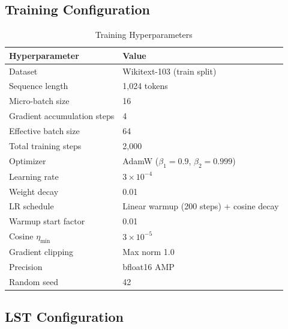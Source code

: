 \documentclass[conference]{IEEEtran}
\begin{document}
\subsection{Training Configuration}

\begin{table}[h]
\centering
\caption{Training Hyperparameters}
\label{tab:training_config}
\begin{tabular}{@{}ll@{}}
\toprule
\textbf{Hyperparameter} & \textbf{Value} \\
\midrule
Dataset & Wikitext-103 (train split) \\
Sequence length & 1,024 tokens \\
Micro-batch size & 16 \\
Gradient accumulation steps & 4 \\
Effective batch size & 64 \\
Total training steps & 2,000 \\
Optimizer & AdamW ($\beta_1 = 0.9$, $\beta_2 = 0.999$) \\
Learning rate & $3 \times 10^{-4}$ \\
Weight decay & 0.01 \\
LR schedule & Linear warmup (200 steps) + cosine decay \\
Warmup start factor & 0.01 \\
Cosine $\eta_{\min}$ & $3 \times 10^{-5}$ \\
Gradient clipping & Max norm 1.0 \\
Precision & bfloat16 AMP \\
Random seed & 42 \\
\bottomrule
\end{tabular}
\end{table}

\subsection{LST Configuration}
\end{document}
